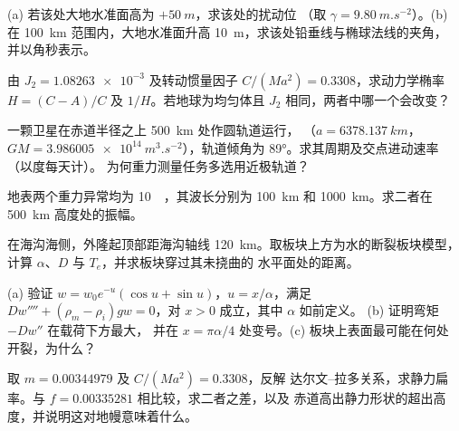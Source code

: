 \begin{exercise}[$\star\star$]\label{exo:b3:gravity-geodesy:5}
(a) 若该处大地水准面高为 $+\qty{50}{m}$，求该处的扰动位
（取 $\gamma = \qty{9.80}{m.s^{-2}}$）。(b) 在 \qty{100}{km} 范围内，大地水准面升高
\qty{10}{m}，求该处铅垂线与椭球法线的夹角，
并以角秒表示。
\end{exercise}

\begin{exercise}[$\star\star$]\label{exo:b3:gravity-geodesy:6}
由 $J_2 = \num{1.08263e-3}$ 及转动惯量因子
$C/(Ma^2) = \num{0.3308}$，求动力学椭率 $H = (C - A)/C$ 及
$1/H$。若地球为均匀体且 $J_2$ 相同，两者中哪一个会改变？
\end{exercise}

\begin{exercise}[$\star\star$]\label{exo:b3:gravity-geodesy:7}
一颗卫星在赤道半径之上 \qty{500}{km} 处作圆轨道运行，
（$a = \qty{6378.137}{km}$，$GM = \qty{3.986005e14}{m^3.s^{-2}}$），轨道倾角为
\ang{89}。求其周期及交点进动速率（以度每天计）。
为何重力测量任务多选用近极轨道？
\end{exercise}

\begin{exercise}[$\star\star$]\label{exo:b3:gravity-geodesy:8}
地表两个重力异常均为 \qty{10}{\milli\gal}，其波长分别为
\qty{100}{km} 和 \qty{1000}{km}。求二者在 \qty{500}{km}
高度处的振幅。
\end{exercise}

\begin{exercise}[$\star\star$]\label{exo:b3:gravity-geodesy:9}
在海沟海侧，外隆起顶部距海沟轴线
\qty{120}{km}。取板块上方为水的断裂板块模型，计算
$\alpha$、$D$ 与 $T_e$，并求板块穿过其未挠曲的
水平面处的距离。
\end{exercise}

\begin{exercise}[$\star\star\star$]\label{exo:b3:gravity-geodesy:10}
(a) 验证 $w = w_0e^{-u}(\cos u + \sin u)$，$u = x/\alpha$，满足
$Dw'''' + (\rho_m - \rho_i)gw = 0$，对 $x > 0$ 成立，其中 $\alpha$ 如前定义。
(b) 证明弯矩 $-Dw''$ 在载荷下方最大，
并在 $x = \pi\alpha/4$ 处变号。(c) 板块上表面最可能在何处
开裂，为什么？
\end{exercise}

\begin{exercise}[$\star\star\star$]\label{exo:b3:gravity-geodesy:11}
取 $m = \num{0.00344979}$ 及 $C/(Ma^2) = \num{0.3308}$，反解
达尔文–拉多关系，求静力扁率。与
$f = \num{0.00335281}$ 相比较，求二者之差，以及
赤道高出静力形状的超出高度，并说明这对地幔意味着什么。
\end{exercise}

